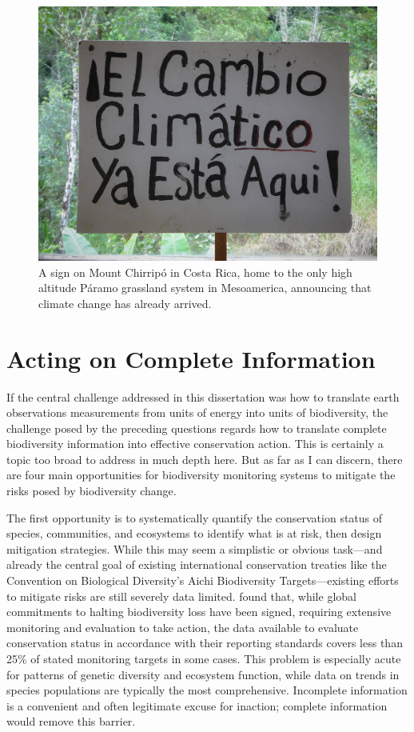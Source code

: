 \begin{figure}[!ht]
    \centering
    \includegraphics[width=\textwidth]{figures/conclusions-climate-change.jpg}
    \caption{A sign on Mount Chirripó in Costa Rica, home to the only high altitude Páramo grassland system in Mesoamerica, announcing that climate change has already arrived.}
    \label{fig:climage-change}
\end{figure}

\section{Acting on Complete Information}

If the central challenge addressed in this dissertation was how to translate earth observations measurements from units of energy into units of biodiversity, the challenge posed by the preceding questions regards how to translate complete biodiversity information into effective conservation action. This is certainly a topic too broad to address in much depth here. But as far as I can discern, there are four main opportunities for biodiversity monitoring systems to mitigate the risks posed by biodiversity change.

The first opportunity is to systematically quantify the conservation status of species, communities, and ecosystems to identify what is at risk, then design mitigation strategies. While this may seem a simplistic or obvious task—and already the central goal of existing international conservation treaties like the Convention on Biological Diversity's Aichi Biodiversity Targets—existing efforts to mitigate risks are still severely data limited. \cite{Geijzendorffer2016-xv} found that, while global commitments to halting biodiversity loss have been signed, requiring extensive monitoring and evaluation to take action, the data available to evaluate conservation status in accordance with their reporting standards covers less than 25\% of stated monitoring targets in some cases. This problem is especially acute for patterns of genetic diversity and ecosystem function, while data on trends in species populations are typically the most comprehensive. Incomplete information is a convenient and often legitimate excuse for inaction; complete information would remove this barrier.

